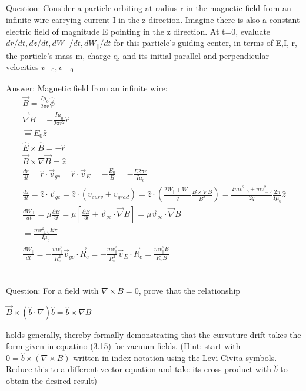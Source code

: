 \documentclass{article}
\newcommand{\partialt}[1]{\frac{\partial #1}{\partial t}}
\begin{document}
\subsection{}
Question: Consider a particle orbiting at radius r in the magnetic field from an infinite wire carrying current I in the z direction. 
Imagine there is also a constant electric field of magnitude E pointing in the z direction. 
At t=0, evaluate $dr/dt, dz/dt, dW_\perp/dt, dW_\parallel/dt$ for this particle's guiding center, in terms of E,I, r, the particle's mass m, charge q, and its initial parallel and perpendicular velocities $v_{\parallel 0},v_{\perp0}$

Answer:
Magnetic field from an infinite wire:
\begin{eqnarray*}
    \vec{B}=\frac{I\mu_0}{2\pi r}\hat{\phi}\\
    \vec{\nabla}B=-\frac{I\mu_0}{2\pi r^2}\hat{r}\\
    \vec=E_0\hat{z}\\
    \hat{E}\times \hat{B}=-\hat{r}\\
    \vec{B}\times\nabla\vec{B}=\hat{z}\\
    \frac{dr}{dt}=\hat{r}\cdot\vec{v}_{gc}=\hat{r}\cdot\vec{v}_E=-\frac{E_0}{B}=-\frac{E 2\pi r}{I \mu_0}\\
    \frac{dz}{dt}=\hat{z}\cdot\vec{v}_{gc}=\hat{z}\cdot(v_{curv}+v_{grad})=\hat{z}\cdot(\frac{2W_\parallel+W_\perp}{q}\frac{B\times\nabla B}{B^3})=\frac{2mv_{\parallel 0}^2+mv_{\perp 0}^2}{2q}\frac{2\pi}{I\mu_0} \hat{z}\\
    \frac{dW_\perp}{dt}=\mu\frac{\partial B}{\partial t}=\mu[\partialt{B}+\vec{v}_{gc}\cdot \vec{\nabla}B]=\mu\vec{v}_{gc}\cdot \vec{\nabla}B \\
    =\frac{mv_{\perp 0}^2E\pi}{I\mu_0}\\
    \frac{dW_\parallel}{dt}=-\frac{mv_\parallel^2}{R_c^2}\vec{v}_{gc}\cdot\vec{R}_c=-\frac{mv_\parallel^2}{R_c^2}\vec{v}_E\cdot\vec{R}_c=\frac{mv_\parallel^2E}{R_cB}\\
\end{eqnarray*}

\subsection{}
Question: For a field with $\nabla \times B=0$, prove that the relationship

$\vec{B}\times (\hat{b}\cdot \nabla)\hat{b}=\hat{b}\times \nabla B$

holds generally, thereby formally demonstrating that the curvature drift takes the form given in equatino (3.15) for vacuum fields.
(Hint: start with $0=\hat{b}\times(\nabla \times B)$ written in index notation using the Levi-Civita symbols. Reduce this to a different vector equation and take its cross-product with $\hat{b}$ to obtain the desired result)
\end{document}
